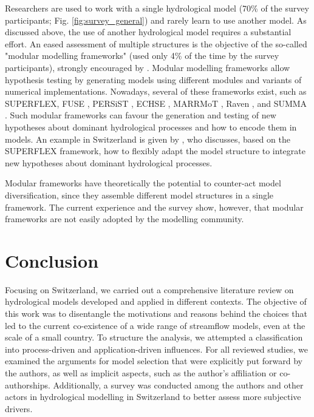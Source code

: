 \documentclass[10pt,a4paper]{article}
\begin{document}
Researchers are used to work with a single hydrological model (70\% of the survey participants; Fig. \ref{fig:survey_general}) and rarely learn to use another model. As discussed above, the use of another hydrological model requires a substantial effort. An eased assessment of multiple structures is the objective of the so-called "modular modelling frameworks" (used only 4\% of the time by the survey participants), strongly encouraged by \citet{Clark2011a}. Modular modelling frameworks allow hypothesis testing by generating models using different modules and variants of numerical implementations. Nowadays, several of these frameworks exist, such as SUPERFLEX, FUSE \citep{Clark2008}, PERSiST \citep{Futter2014}, ECHSE \citep{Kneis2015}, MARRMoT \citep{Knoben2019}, Raven \citep{Craig2020}, and SUMMA \citep{Clark2015}. Such modular frameworks can favour the generation and testing of new hypotheses about dominant hydrological processes and how to encode them in models. An example in Switzerland is given by \citet{DalMolin2020}, who discusses, based on the SUPERFLEX framework, how to flexibly adapt the model structure to integrate new hypotheses about dominant hydrological processes. 

Modular frameworks have theoretically the potential to counter-act model diversification, since they assemble different model structures in a single framework. The current experience and the survey show, however, that modular frameworks are not easily adopted by the modelling community. 


\section{Conclusion}
\label{sec:conclusion}

Focusing on Switzerland, we carried out a comprehensive literature review on hydrological models developed and applied in different contexts. The objective of this work was to disentangle the motivations and reasons behind the choices that led to the current co-existence of a wide range of streamflow models, even at the scale of a small country. To structure the analysis, we attempted a classification into process-driven and application-driven influences. For all reviewed studies, we examined the arguments for model selection that were explicitly put forward by the authors, as well as implicit aspects, such as the author's affiliation or co-authorships. Additionally, a survey was conducted among the authors and other actors in hydrological modelling in Switzerland to better assess more subjective drivers.
\end{document}
